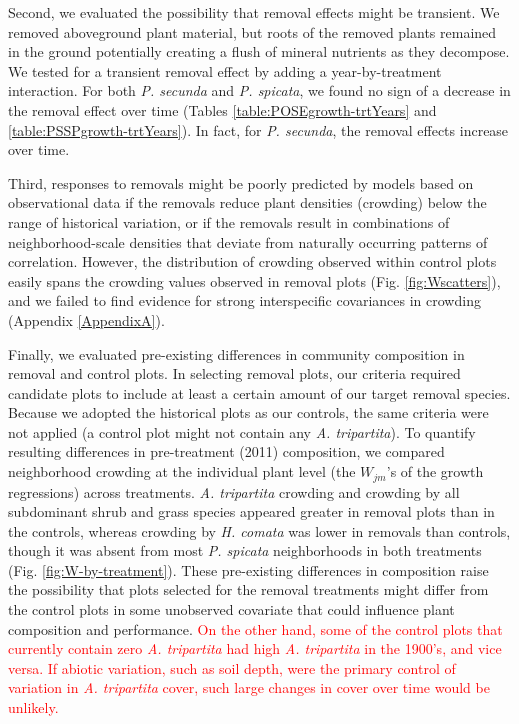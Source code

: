 \documentclass[11pt]{article}
\newcommand{\new}{\textcolor{red}}
\begin{document}
\begin{doublespacing}
Second, we evaluated the possibility that removal effects might be transient. We removed aboveground plant material, but roots of the removed plants remained in the ground potentially creating a flush of mineral nutrients as they decompose. We tested for a transient removal effect by adding a year-by-treatment interaction. For both  \textit{P. secunda}  and \textit{P. spicata}, we found no sign of a decrease in the removal effect over time (Tables \ref{table:POSEgrowth-trtYears} and \ref{table:PSSPgrowth-trtYears}). In fact, for  \textit{P. secunda}, the removal effects increase over time.

Third, responses to removals might be poorly predicted by models based on observational data if the removals reduce plant densities (crowding) below the range of historical variation, or if the removals result in combinations of neighborhood-scale densities that deviate from naturally occurring patterns of correlation. However, the distribution of crowding observed within control plots easily spans the crowding values observed in removal plots (Fig. \ref{fig:Wscatters}), and we failed to find evidence for strong interspecific covariances in crowding (Appendix \ref{AppendixA}).

Finally, we evaluated pre-existing differences in community composition in removal and control plots. In selecting removal plots, our criteria required candidate plots to include at least a certain amount of our target removal species. Because we adopted the historical plots as our controls, the same criteria were not applied (a control plot might not contain any \textit{A. tripartita}). To quantify resulting differences in pre-treatment (2011) composition, we compared neighborhood crowding at the individual plant level (the $W_{jm}$'s of the growth regressions) across treatments. \textit{A. tripartita} crowding and crowding by all subdominant shrub and grass species appeared greater in removal plots than in the controls, whereas crowding by \textit{H. comata} was lower in removals than controls, though it was absent from most \textit{P. spicata} neighborhoods in both treatments (Fig. \ref{fig:W-by-treatment}). These pre-existing differences in composition raise the possibility that plots selected for the removal treatments might differ from the control plots in some unobserved covariate that could influence plant composition and performance. \new{On the other hand, some of the control plots that currently contain zero \textit{A. tripartita} had high \textit{A. tripartita} in the 1900's, and vice versa. If abiotic variation, such as soil depth, were the primary control of variation in \textit{A. tripartita} cover, such large changes in cover over time would be unlikely. }


\end{doublespacing}
\end{document}
